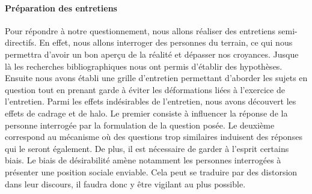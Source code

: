 \documentclass[12pt]{article}
\begin{document}




\paragraph{Préparation des entretiens}

Pour répondre à notre questionnement, nous allons réaliser des entretiens semi-directifs. En effet, nous allons interroger des personnes du terrain, ce qui nous permettra d'avoir un bon aperçu de la réalité et dépasser nos croyances. Jusque là les recherches bibliographiques nous ont permis d'établir des hypothèses. Ensuite nous avons établi une grille d'entretien permettant d'aborder les sujets en question tout en prenant garde à éviter les déformations liées à l'exercice de l'entretien. Parmi les effets indésirables de l'entretien, nous avons découvert les effets de cadrage et de halo. Le premier consiste à influencer la réponse de la personne interrogée par la formulation de la question posée. Le deuxième correspond au mécanisme où des questions trop similaires induisent des réponses qui le seront également. De plus, il est nécessaire de garder à l'esprit certains biais. Le biais de désirabilité amène notamment les personnes interrogées à présenter une position sociale enviable. Cela peut se traduire par des distorsion dans leur discours, il faudra donc y être vigilant au plus possible.
\end{document}
